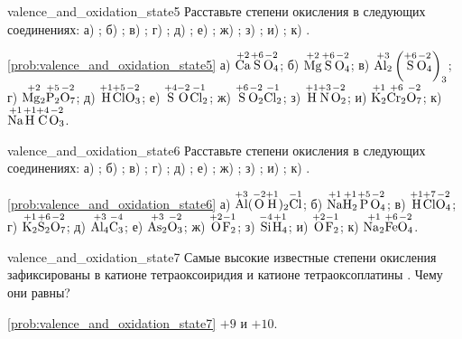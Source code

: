 \begin{problem}{}{valence_and_oxidation_state5}
    Расставьте степени окисления в следующих соединениях: а) ; б) ; в) ; г) ; д) ; е) ; ж) ; з) ; и) ; к) .
    \begin{sol}{\ref{prob:valence_and_oxidation_state5}}
        а) $\overset{+2}{\ce{Ca}}\overset{+6}{\ce{S}}\overset{-2}{\ce{O4}}$; б) $\overset{+2}{\ce{Mg}}\overset{+6}{\ce{S}}\overset{-2}{\ce{O4}}$; в) $\overset{+3}{\ce{Al2}}\left(\overset{+6}{\ce{S}}\overset{-2}{\ce{O4}}\right)_3$; г) $\overset{+2}{\ce{Mg2}}\overset{+5}{\ce{P2}}\overset{-2}{\ce{O7}}$; д) $\overset{+1}{\ce{H}}\overset{+5}{\ce{Cl}}\overset{-2}{\ce{O3}}$; е) $\overset{+4}{\ce{S}}\overset{-2}{\ce{O}}\overset{-1}{\ce{Cl2}}$; ж) $\overset{+6}{\ce{S}}\overset{-2}{\ce{O2}}\overset{-1}{\ce{Cl2}}$; з) $\overset{+1}{\ce{H}}\overset{+3}{\ce{N}}\overset{-2}{\ce{O2}}$; и) $\overset{+1}{\ce{K2}}\overset{+6}{\ce{Cr2}}\overset{-2}{\ce{O7}}$; к) $\overset{+1}{\ce{Na}}\overset{+1}{\ce{H}}\overset{+4}{\ce{C}}\overset{-2}{\ce{O3}}$.
    \end{sol}
 \end{problem}

\begin{problem}{}{valence_and_oxidation_state6}
    Расставьте степени окисления в следующих соединениях: а) ; б) ; в) ; г) ; д) ; е) ; ж) ; з) ; и) ; к) .
    \begin{sol}{\ref{prob:valence_and_oxidation_state6}}
        а) $\overset{+3}{\ce{Al}}(\overset{-2}{\ce{O}}\overset{+1}{\ce{H}})_2\overset{-1}{\ce{Cl}}$; б) $\overset{+1}{\ce{Na}}\overset{+1}{\ce{H2}}\overset{+5}{\ce{P}}\overset{-2}{\ce{O4}}$; в) $\overset{+1}{\ce{H}}\overset{+7}{\ce{Cl}}\overset{-2}{\ce{O4}}$; г) $\overset{+1}{\ce{K2}}\overset{+6}{\ce{S2}}\overset{-2}{\ce{O7}}$; д) $\overset{+3}{\ce{Al4}}\overset{-4}{\ce{C3}}$; е) $\overset{+3}{\ce{As2}}\overset{-2}{\ce{O3}}$; ж) $\overset{+2}{\ce{O}}\overset{-1}{\ce{F2}}$; з) $\overset{-4}{\ce{Si}}\overset{+1}{\ce{H4}}$; и) $\overset{+2}{\ce{O}}\overset{-1}{\ce{F2}}$; к) $\overset{+1}{\ce{Na2}}\overset{+6}{\ce{Fe}}\overset{-2}{\ce{O4}}$.
    \end{sol}
\end{problem}

\begin{problem}{}{valence_and_oxidation_state7}
    Самые высокие известные степени окисления зафиксированы в катионе тетраоксоиридия  и катионе тетраоксоплатины . Чему они равны?
    \begin{sol}{\ref{prob:valence_and_oxidation_state7}}
        $+9$ и $+10$.
    \end{sol}
\end{problem}

